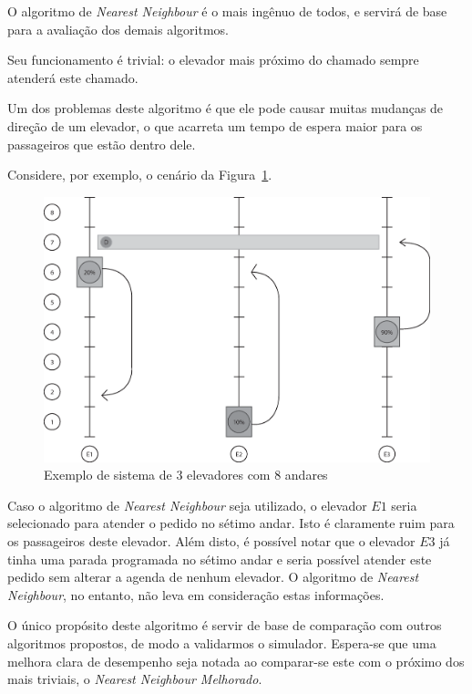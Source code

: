 O algoritmo de \textit{Nearest Neighbour} é o mais ingênuo de todos, e servirá
de base para a avaliação dos demais algoritmos.

Seu funcionamento é trivial: o elevador mais próximo do chamado sempre
atenderá este chamado.

Um dos problemas deste algoritmo é que ele pode causar muitas mudanças de
direção de um elevador, o que acarreta um tempo de espera maior para os
passageiros que estão dentro dele.

Considere, por exemplo, o cenário da Figura~\ref{fig:elevadores:nn:bad}.

\begin{figure}[htb!]
  \centering
  \includegraphics[scale=0.6]{img/elevator_example_nn_bad.eps}
  \caption{Exemplo de sistema de 3 elevadores com 8 andares}
\label{fig:elevadores:nn:bad}
\end{figure}

Caso o algoritmo de \textit{Nearest Neighbour} seja utilizado, o elevador $E1$
seria selecionado para atender o pedido no sétimo andar. Isto é claramente ruim
para os passageiros deste elevador. Além disto, é possível notar que o elevador
$E3$ já tinha uma parada programada no sétimo andar e seria possível atender
este pedido sem alterar a agenda de nenhum elevador. O algoritmo de
\textit{Nearest Neighbour}, no entanto, não leva em consideração estas informações.

O único propósito deste algoritmo é servir de base de comparação com outros
algoritmos propostos, de modo a validarmos o simulador. Espera-se que uma
melhora clara de desempenho seja notada ao comparar-se este com o próximo dos
mais triviais, o \textit{Nearest Neighbour Melhorado}.

